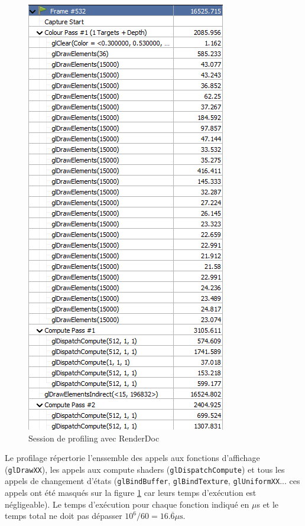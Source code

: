 \documentclass{EPUProjetDi}
\newcommand{\code}{\texttt}
\begin{document}
\begin{figure}
	\begin{center}
		\includegraphics[scale=.4]{profiling}
	\end{center}
	\caption{Session de profiling avec RenderDoc}
	\label{fig:profiling}
\end{figure}

Le profilage répertorie l'enssemble des appels aux fonctions d'affichage (\code{glDrawXX}), les appels aux compute shaders (\code{glDispatchCompute}) et tous les appels de changement d'états (\code{glBindBuffer}, \code{glBindTexture}, \code{glUniformXX}... ces appels ont été masqués sur la figure \ref{fig:profiling} car leurs temps d'exécution est négligeable). Le temps d'exécution pour chaque fonction indiqué en $\mu$s et le temps total ne doit pas dépasser $10^6/60=16.\overline{6}\mu\text{s}$.
\end{document}

